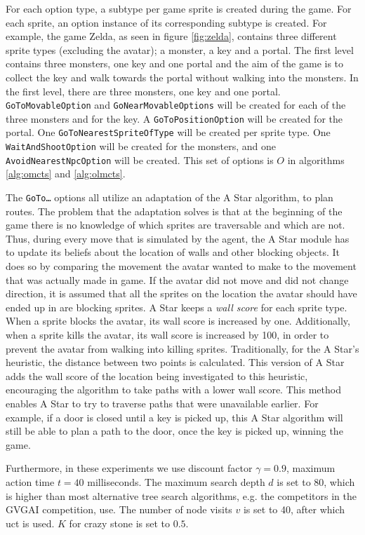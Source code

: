 For each option type, a subtype per game sprite is created during the game. For
each sprite, an option instance of its corresponding subtype is created. For
example, the game Zelda, as seen in figure \ref{fig:zelda}, contains three
different sprite types (excluding the avatar); a monster, a key and a portal.
The first level contains three monsters, one key and one portal and the aim of
the game is to collect the key and walk towards the portal without walking into
the monsters. In the first level, there are three monsters, one key and one
portal. \texttt{GoToMovableOption} and \texttt{GoNearMovableOptions} will be
created for each of the three monsters and for the key. A
\texttt{GoToPositionOption} will be created for the portal.  One
\texttt{GoToNearestSpriteOfType} will be created per sprite type. One
\texttt{WaitAndShootOption} will be created for the monsters, and one
\texttt{AvoidNearestNpcOption} will be created. This set of options is $O$ in
algorithms \ref{alg:omcts} and \ref{alg:olmcts}.

The \texttt{GoTo\ldots} options all utilize an adaptation of the A Star
algorithm, to plan routes. The problem that the adaptation solves is that at the
beginning of the game there is no knowledge of which sprites are traversable and
which are not. Thus, during every move that is simulated by the agent, the A
Star module has to update its beliefs about the location of walls and other
blocking objects. It does so by comparing the movement the avatar wanted to make
to the movement that was actually made in game. If the avatar did not move and
did not change direction, it is assumed that all the sprites on the location the
avatar should have ended up in are blocking sprites. A Star keeps a \emph{wall
score} for each sprite type. When a sprite blocks the avatar, its wall score is
increased by one. Additionally, when a sprite kills the avatar, its wall score
is increased by 100, in order to prevent the avatar from walking into killing
sprites. Traditionally, for the A Star's heuristic, the distance between two
points is calculated. This version of A Star adds the wall score of the location
being investigated to this heuristic, encouraging the algorithm to take paths
with a lower wall score. This method enables A Star to try to traverse paths
that were unavailable earlier. For example, if a door is closed until a key is
picked up, this A Star algorithm will still be able to plan a path to the door,
once the key is picked up, winning the game.

Furthermore, in these experiments we use discount factor $\gamma = 0.9$, maximum
action time $t = 40$ milliseconds. The maximum search depth $d$ is set to 80,
which is higher than most alternative tree search algorithms, e.g.
the competitors in the GVGAI competition, use. The number of node visits $v$ is set
to 40, after which \textsf{uct} is used. $K$ for crazy stone is set to $0.5$.

